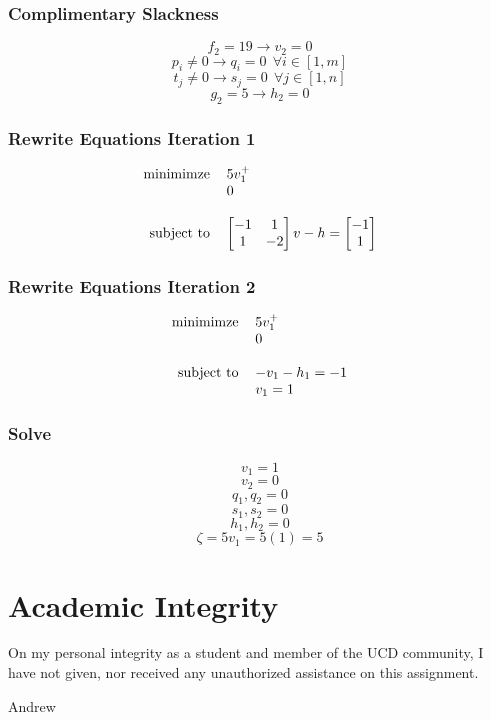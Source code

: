 \documentclass[14pt]{extarticle}
\begin{document}
\subsubsection*{Complimentary Slackness}
\[f_2 = 19 \to v_2 = 0\]
\[p_i \neq 0 \to q_i = 0 \ \ \forall i \in [1, m]\]
\[t_j \neq 0 \to s_j = 0 \ \ \forall j \in [1, n]\]
\[g_2 = 5 \to h_2 = 0\]

\subsubsection*{Rewrite Equations Iteration 1}
\[\begin{tabular}{r l}
    minimimze & $5v_1^+$ \\
    & $0$ \\
    \\
    subject to & $\begin{bmatrix}
        -1 & 1 \\
        1 & -2 \\
    \end{bmatrix}v-h=\begin{bmatrix}
        -1 \\
        1 \\
    \end{bmatrix}$
\end{tabular}\]

\subsubsection*{Rewrite Equations Iteration 2}
\[\begin{tabular}{r l}
    minimimze & $5v_1^+$ \\
    & $0$ \\
    \\
    subject to & $-v_1 - h_1 = -1$ \\
    & $v_1 = 1$ \\
\end{tabular}\]

\subsubsection*{Solve}
\[v_1 = 1\]
\[v_2 = 0\]
\[q_1, q_2 = 0\]
\[s_1, s_2 = 0\]
\[h_1, h_2 = 0\]
\[\zeta = 5v_1 = 5(1) = 5\]

\section*{Academic Integrity}
On my personal integrity as a student and member of the UCD community, I have not given, nor received any unauthorized assistance on this assignment.

\bigskip Andrew
\end{document}
